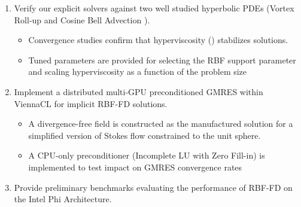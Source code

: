 \documentclass[11pt]{report}
\begin{document}
\begin{enumerate}
\item Verify our explicit solvers against two well studied hyperbolic PDEs (Vortex Roll-up \cite{NairTransport05, NairJablonowski08} and Cosine Bell Advection \cite{JakobChien1995}).
\begin{itemize} 
\item Convergence studies confirm that hyperviscosity (\cite{Fornberg2011b}) stabilizes solutions.
\item Tuned parameters are provided for selecting the RBF support parameter and scaling hyperviscosity as a function of the problem size
\end{itemize}
\item Implement a distributed multi-GPU preconditioned GMRES within ViennaCL for implicit RBF-FD solutions.
\begin{itemize} 
\item A divergence-free field is constructed as the manufactured solution for a simplified version of Stokes flow constrained to the unit sphere. 
\item A CPU-only preconditioner (Incomplete LU with Zero Fill-in) is implemented to test impact on GMRES convergence rates 
\end{itemize}
\item Provide preliminary benchmarks evaluating the performance of RBF-FD on the Intel Phi Architecture. 
\end{enumerate}



\ifstandalone


\end{document}
